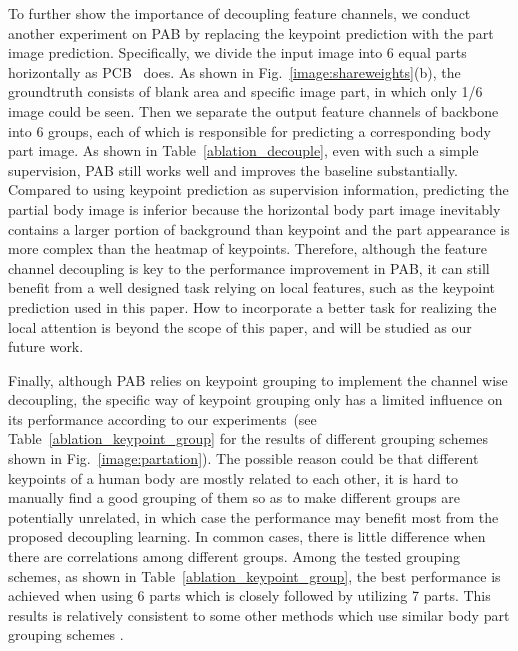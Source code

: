 \documentclass[10pt,twocolumn,letterpaper]{article}
\begin{document}
To further show the importance of decoupling feature channels, we conduct another experiment on PAB by replacing the keypoint prediction with the part image prediction. Specifically, we divide the input image into 6 equal parts horizontally as PCB~\cite{sun2018beyond} does. As shown in Fig.~\ref{image:shareweights}(b), the groundtruth consists of blank area and specific image part, in which only 1/6 image could be seen. Then we separate the output feature channels of backbone into 6 groups, each of which is responsible for predicting a corresponding body part image. As shown in Table~\ref{ablation_decouple}, even with such a simple supervision, PAB still works well and improves the baseline substantially. Compared to using keypoint prediction as supervision information, predicting the partial body image is inferior because the horizontal body part image inevitably contains a larger portion of background than keypoint and the part appearance is more complex than the heatmap of keypoints. Therefore, although the feature channel decoupling is key to the performance improvement in PAB, it can still benefit from a well designed task relying on local features, such as the keypoint prediction used in this paper. 
How to incorporate a better task for realizing the local attention is beyond the scope of this paper, and will be studied as our future work.

Finally, although PAB relies on keypoint grouping to implement the channel wise decoupling, the specific way of keypoint grouping only has a limited influence on its performance according to our experiments~(see Table~\ref{ablation_keypoint_group} for the results of different grouping schemes shown in Fig.~\ref{image:partation}). The possible reason could be that different keypoints of a human body are mostly related to each other, it is hard to manually find a good grouping of them so as to make different groups are potentially unrelated, in which case the performance may benefit most from the proposed decoupling learning. In common cases, there is little difference when there are correlations among different groups. Among the tested grouping schemes, as shown in Table~\ref{ablation_keypoint_group}, the best performance is achieved when using 6 parts which is closely followed by utilizing 7 parts. This results is relatively consistent to some other methods which use similar body part grouping schemes \cite{zhao2017deeply,sun2018beyond}.
\end{document}
